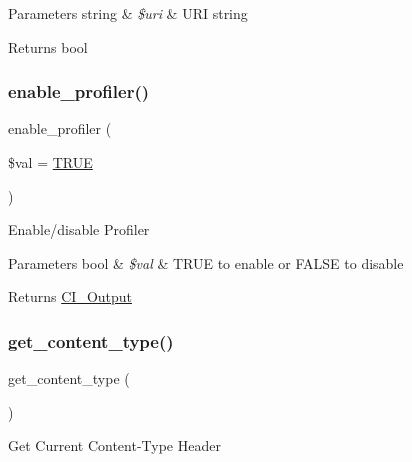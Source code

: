 \begin{DoxyParams}[1]{Parameters}
string & {\em \$uri} & U\+RI string \\
\hline
\end{DoxyParams}
\begin{DoxyReturn}{Returns}
bool 
\end{DoxyReturn}
\mbox{\label{class_c_i___output_a7bd693db25952e1b074630f52ee67500}} 
\subsubsection{\texorpdfstring{enable\+\_\+profiler()}{enable\_profiler()}}
{\footnotesize\ttfamily enable\+\_\+profiler (\begin{DoxyParamCaption}\item[{}]{\$val = {\ttfamily \mbox{\hyperlink{constants_8php_ae04a3efe6aa42044f803ee90c2277846}{T\+R\+UE}}} }\end{DoxyParamCaption})}

Enable/disable Profiler


\begin{DoxyParams}[1]{Parameters}
bool & {\em \$val} & T\+R\+UE to enable or F\+A\+L\+SE to disable \\
\hline
\end{DoxyParams}
\begin{DoxyReturn}{Returns}
\mbox{\hyperlink{class_c_i___output}{C\+I\+\_\+\+Output}} 
\end{DoxyReturn}
\mbox{\label{class_c_i___output_a4d8c59d65c47c9146dbc1c7d0c4eccf2}} 
\subsubsection{\texorpdfstring{get\+\_\+content\+\_\+type()}{get\_content\_type()}}
{\footnotesize\ttfamily get\+\_\+content\+\_\+type (\begin{DoxyParamCaption}{ }\end{DoxyParamCaption})}

Get Current Content-\/\+Type Header


